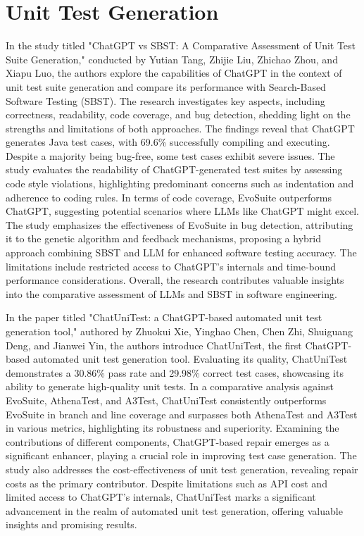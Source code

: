 \section{Unit Test Generation}
\label{sec:soa_unit_test_generation}
\vspace{0.2 cm}

In the study titled "ChatGPT vs SBST: A Comparative Assessment of Unit Test Suite Generation,"\cite{tang_chatgpt_2023} conducted by Yutian Tang, Zhijie Liu, Zhichao Zhou, and Xiapu Luo, the authors explore the capabilities of ChatGPT in the context of unit test suite generation and compare its performance with Search-Based Software Testing (SBST). The research investigates key aspects, including correctness, readability, code coverage, and bug detection, shedding light on the strengths and limitations of both approaches. The findings reveal that ChatGPT generates Java test cases, with 69.6\% successfully compiling and executing. Despite a majority being bug-free, some test cases exhibit severe issues. The study evaluates the readability of ChatGPT-generated test suites by assessing code style violations, highlighting predominant concerns such as indentation and adherence to coding rules. In terms of code coverage, EvoSuite outperforms ChatGPT, suggesting potential scenarios where LLMs like ChatGPT might excel. The study emphasizes the effectiveness of EvoSuite in bug detection, attributing it to the genetic algorithm and feedback mechanisms, proposing a hybrid approach combining SBST and LLM for enhanced software testing accuracy. The limitations include restricted access to ChatGPT's internals and time-bound performance considerations. Overall, the research contributes valuable insights into the comparative assessment of LLMs and SBST in software engineering.

In the paper titled "ChatUniTest: a ChatGPT-based automated unit test generation tool," authored by Zhuokui Xie, Yinghao Chen, Chen Zhi, Shuiguang Deng, and Jianwei Yin, the authors introduce ChatUniTest\cite{xie_chatunitest_2023}, the first ChatGPT-based automated unit test generation tool. Evaluating its quality, ChatUniTest demonstrates a 30.86\% pass rate and 29.98\% correct test cases, showcasing its ability to generate high-quality unit tests. In a comparative analysis against EvoSuite, AthenaTest, and A3Test, ChatUniTest consistently outperforms EvoSuite in branch and line coverage and surpasses both AthenaTest and A3Test in various metrics, highlighting its robustness and superiority. Examining the contributions of different components, ChatGPT-based repair emerges as a significant enhancer, playing a crucial role in improving test case generation. The study also addresses the cost-effectiveness of unit test generation, revealing repair costs as the primary contributor. Despite limitations such as API cost and limited access to ChatGPT's internals, ChatUniTest marks a significant advancement in the realm of automated unit test generation, offering valuable insights and promising results.